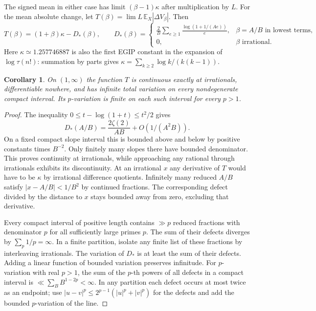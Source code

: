 \documentclass[10pt]{article}
\newtheorem{corollary}[theorem]{Corollary}
\newcommand{\EE}{\mathbb E_X}
\begin{document}
The signed mean in either case has limit $(\beta-1)\kappa$ after multiplication by $L$. For the mean absolute change, let $T(\beta)=\lim L\,\EE|\Delta V_\beta|$. Then
\begin{equation}\label{defect}
  T(\beta)=(1+\beta)\kappa-D_*(\beta),\qquad
  D_*(\beta)=
  \begin{cases}
  \displaystyle\frac{2}{B}\sum_{e\ge1}\frac{\log(1+1/(Ae))}{e},
     &\beta=A/B\text{ in lowest terms},\\
  0,&\beta\text{ irrational}.
  \end{cases}
\end{equation}
Here $\kappa\simeq1.257746887$ is also the first EGIP constant in the expansion of $\log \tau(n!)$: summation by parts gives $\kappa=\sum_{k\ge2}\log k/(k(k-1))$.

\begin{corollary}\label{rough}
On $(1,\infty)$ the function $T$ is continuous exactly at irrationals, differentiable nowhere, and has infinite total variation on every nondegenerate compact interval. Its $p$-variation is finite on each such interval for every $p>1$.
\end{corollary}
\begin{proof}
The inequality $0\le t-\log(1+t)\le t^2/2$ gives
\[
 D_*(A/B)=\frac{2\zeta(2)}{AB}+O(1/(A^2B)).
\]
On a fixed compact slope interval this is bounded above and below by positive constants times $B^{-2}$. Only finitely many slopes there have bounded denominator. This proves continuity at irrationals, while approaching any rational through irrationals exhibits its discontinuity. At an irrational $x$ any derivative of $T$ would have to be $\kappa$ by irrational difference quotients. Infinitely many reduced $A/B$ satisfy $|x-A/B|<1/B^2$ by continued fractions. The corresponding defect divided by the distance to $x$ stays bounded away from zero, excluding that derivative.

Every compact interval of positive length contains $\gg p$ reduced fractions with denominator $p$ for all sufficiently large primes $p$. The sum of their defects diverges by $\sum_p1/p=\infty$. In a finite partition, isolate any finite list of these fractions by interleaving irrationals. The variation of $D_*$ is at least the sum of their defects. Adding a linear function of bounded variation preserves infinitude. For $p$-variation with real $p>1$, the sum of the $p$-th powers of all defects in a compact interval is $\ll\sum_B B^{1-2p}<\infty$. In any partition each defect occurs at most twice as an endpoint; use $|u-v|^p\le2^{p-1}(|u|^p+|v|^p)$ for the defects and add the bounded $p$-variation of the line.
\end{proof}
\end{document}
